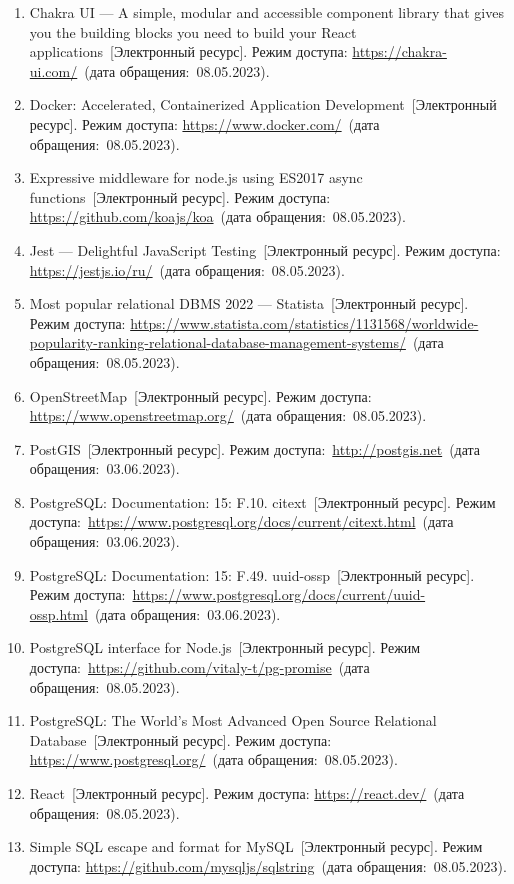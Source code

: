 \begin{enumerate}
    \item \label{chakra} Chakra UI --- A simple, modular and accessible component library that gives you the building blocks you need to build your React applications~[Электронный ресурс]. Режим доступа: \url{https://chakra-ui.com/}~(дата обращения:~08.05.2023).
    \item \label{docker} Docker: Accelerated, Containerized Application Development~[Электронный ресурс]. Режим доступа: \url{https://www.docker.com/}~(дата обращения:~08.05.2023).
    \item \label{koa} Expressive middleware for node.js using ES2017 async functions~[Электронный ресурс]. Режим доступа: \url{https://github.com/koajs/koa}~(дата обращения:~08.05.2023).
    \item \label{jest} Jest --- Delightful JavaScript Testing~[Электронный ресурс]. Режим доступа: \url{https://jestjs.io/ru/}~(дата обращения:~08.05.2023).
    \item \label{dmbs} Most popular relational DBMS 2022 --- Statista~[Электронный ресурс]. Режим доступа: \url{https://www.statista.com/statistics/1131568/worldwide-popularity-ranking-relational-database-management-systems/}~(дата обращения:~08.05.2023).
    \item \label{osm} OpenStreetMap~[Электронный ресурс]. Режим доступа: \url{https://www.openstreetmap.org/}~(дата обращения:~08.05.2023).
    \item \label{postgis} PostGIS~[Электронный ресурс]. Режим доступа:~\url{http://postgis.net}~(дата обращения:~03.06.2023).
    \item \label{citext} PostgreSQL: Documentation: 15: F.10. citext~[Электронный ресурс]. Режим доступа:~\url{https://www.postgresql.org/docs/current/citext.html}~(дата обращения:~03.06.2023).
    \item \label{uuid-ossp} PostgreSQL: Documentation: 15: F.49. uuid-ossp~[Электронный ресурс]. Режим доступа:~\url{https://www.postgresql.org/docs/current/uuid-ossp.html}~(дата обращения:~03.06.2023).
    \item \label{pg-promise} PostgreSQL interface for Node.js~[Электронный ресурс]. Режим доступа:~\url{https://github.com/vitaly-t/pg-promise}~(дата обращения:~08.05.2023).
    \item \label{postgres} PostgreSQL: The World's Most Advanced Open Source Relational Database~[Электронный ресурс]. Режим доступа: \url{https://www.postgresql.org/}~(дата обращения:~08.05.2023).
    \item \label{react} React~[Электронный ресурс]. Режим доступа: \url{https://react.dev/}~(дата обращения:~08.05.2023).
    \item \label{sqlstring} Simple SQL escape and format for MySQL~[Электронный ресурс]. Режим доступа: \url{https://github.com/mysqljs/sqlstring}~(дата обращения:~08.05.2023).
\end{enumerate}